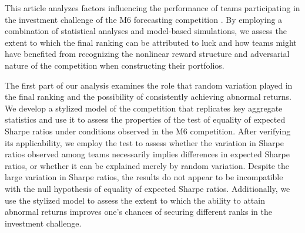 \documentclass[3p,times,twocolumn]{elsarticle}
\begin{document}
This article analyzes factors influencing the performance of teams participating in the investment challenge of the M6 forecasting competition \citep[see][]{makridakisM6ForecastingCompetition2023}.
By employing a combination of statistical analyses and model-based simulations, we assess the extent to which the final ranking can be attributed to luck and how teams might have benefited from recognizing the nonlinear reward structure and adversarial nature of the competition when constructing their portfolios.

The first part of our analysis examines the role that random variation played in the final ranking and the possibility of consistently achieving abnormal returns.
We develop a stylized model of the competition that replicates key aggregate statistics and use it to assess the properties of the \citet{wrightTestEqualityMultiple2014} test of equality of expected Sharpe ratios under conditions observed in the M6 competition.
After verifying its applicability, we employ the test to assess whether the variation in Sharpe ratios observed among teams necessarily implies differences in expected Sharpe ratios, or whether it can be explained merely by random variation.
Despite the large variation in Sharpe ratios, the results do not appear to be incompatible with the null hypothesis of equality of expected Sharpe ratios.
Additionally, we use the stylized model to assess the extent to which the ability to attain abnormal returns improves one’s chances of securing different ranks in the investment challenge.
\end{document}
